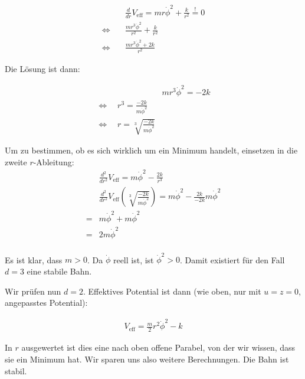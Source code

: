 \documentclass[a4paper,german,12pt,smallheadings]{scrartcl}
\begin{document}
\begin{align*}
  &\frac{d}{dr} V_{\text{eff}} = mr\dot{\phi}^2 + \frac{k}{r^2} \overset{!}{=} 0 \\
  \Leftrightarrow\quad&\frac{mr^3\dot{\phi}^2}{r^2} + \frac{k}{r^2} \\
  \Leftrightarrow\quad&\frac{mr^3\dot{\phi}^2 + 2k}{r^2}
\end{align*}

Die Lösung ist dann:

\begin{align*}
  &mr^3\dot{\phi}^2 = -2k \\
  \Leftrightarrow\quad r^3 = \frac{-2k}{m\dot{\phi}^2} \\
  \Leftrightarrow\quad r = \sqrt[3]{\frac{-2k}{m\dot{\phi}^2}}
\end{align*}

Um zu bestimmen, ob es sich wirklich um ein Minimum handelt, einsetzen in die zweite $r$-Ableitung:
\begin{align*}
  &\frac{d^2}{dr^2} V_{\text{eff}} = m\dot{\phi}^2 - \frac{2k}{r^3}\\
  &\frac{d^2}{dr^2} V_{\text{eff}}(\sqrt[3]{\frac{-2k}{m\dot{\phi}^2}}) =  m\dot{\phi}^2 - \frac{2k}{-2k} m\dot{\phi}^2 \\
  = &m\dot{\phi}^2 + m\dot{\phi}^2 \\
  = &2m\dot{\phi}^2\\
\end{align*}

Es ist klar, dass $m > 0$. Da $\dot{\phi}$ reell ist, ist $\dot{\phi}^2 > 0$. Damit existiert für den Fall $d=3$ eine stabile Bahn.

Wir prüfen nun $d=2$. Effektives Potential ist dann (wie oben, nur mit $u=z=0$, angepasstes Potential):

\begin{align*}
  V_{\text{eff}} = \frac{m}{2}r^2\dot{\phi}^2 - k
\end{align*}

In $r$ ausgewertet ist dies eine nach oben offene Parabel, von der wir wissen,
dass sie ein Minimum hat. Wir sparen uns also weitere Berechnungen. Die Bahn
ist stabil.
\end{document}
